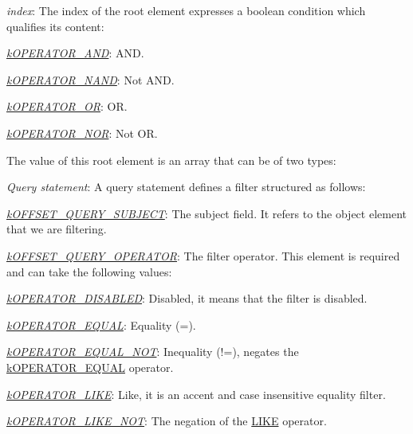 {\itshape 
\begin{DoxyItemize}
\item {\itshape index}\-: The index of the root element expresses a boolean condition which qualifies its content\-: 
\begin{DoxyItemize}
\item {\itshape \hyperlink{}{k\-O\-P\-E\-R\-A\-T\-O\-R\-\_\-\-A\-N\-D}}\-: A\-N\-D. 
\item {\itshape \hyperlink{}{k\-O\-P\-E\-R\-A\-T\-O\-R\-\_\-\-N\-A\-N\-D}}\-: Not A\-N\-D. 
\item {\itshape \hyperlink{}{k\-O\-P\-E\-R\-A\-T\-O\-R\-\_\-\-O\-R}}\-: O\-R. 
\item {\itshape \hyperlink{}{k\-O\-P\-E\-R\-A\-T\-O\-R\-\_\-\-N\-O\-R}}\-: Not O\-R. 
\end{DoxyItemize}The value of this root element is an array that can be of two types\-: 
\begin{DoxyItemize}
\item {\itshape Query statement}\-: A query statement defines a filter structured as follows\-: 
\begin{DoxyItemize}
\item {\itshape \hyperlink{}{k\-O\-F\-F\-S\-E\-T\-\_\-\-Q\-U\-E\-R\-Y\-\_\-\-S\-U\-B\-J\-E\-C\-T}}\-: The subject field. It refers to the object element that we are filtering. 
\item {\itshape \hyperlink{}{k\-O\-F\-F\-S\-E\-T\-\_\-\-Q\-U\-E\-R\-Y\-\_\-\-O\-P\-E\-R\-A\-T\-O\-R}}\-: The filter operator. This element is required and can take the following values\-: 
\begin{DoxyItemize}
\item {\itshape \hyperlink{}{k\-O\-P\-E\-R\-A\-T\-O\-R\-\_\-\-D\-I\-S\-A\-B\-L\-E\-D}}\-: Disabled, it means that the filter is disabled. 
\item {\itshape \hyperlink{}{k\-O\-P\-E\-R\-A\-T\-O\-R\-\_\-\-E\-Q\-U\-A\-L}}\-: Equality ({\ttfamily =}). 
\item {\itshape \hyperlink{}{k\-O\-P\-E\-R\-A\-T\-O\-R\-\_\-\-E\-Q\-U\-A\-L\-\_\-\-N\-O\-T}}\-: Inequality ({\ttfamily !=}), negates the \hyperlink{}{k\-O\-P\-E\-R\-A\-T\-O\-R\-\_\-\-E\-Q\-U\-A\-L} operator. 
\item {\itshape \hyperlink{}{k\-O\-P\-E\-R\-A\-T\-O\-R\-\_\-\-L\-I\-K\-E}}\-: Like, it is an accent and case insensitive equality filter. 
\item {\itshape \hyperlink{}{k\-O\-P\-E\-R\-A\-T\-O\-R\-\_\-\-L\-I\-K\-E\-\_\-\-N\-O\-T}}\-: The negation of the \hyperlink{}{L\-I\-K\-E} operator. 

\end{DoxyItemize}
\end{DoxyItemize}
\end{DoxyItemize}
\end{DoxyItemize}}
